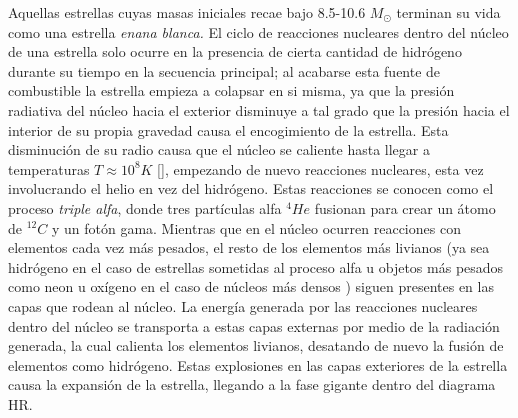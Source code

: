 Aquellas estrellas cuyas masas iniciales recae bajo 8.5-10.6 \(M_{\odot}\)
terminan su vida como una estrella \textit{enana blanca.}
\citet*{whiteDwarfsReview} El ciclo de reacciones nucleares dentro del núcleo de
una estrella solo ocurre en la presencia de cierta cantidad de hidrógeno durante
su tiempo en la secuencia principal; al acabarse esta fuente de combustible la
estrella empieza a colapsar en si misma, ya que la presión radiativa del núcleo
hacia el exterior disminuye a tal grado que la presión hacia el interior de su
propia gravedad causa el encogimiento de la estrella. Esta disminución de su
radio causa que el núcleo se caliente hasta llegar a temperaturas \(T \approx
10^{8} K\) [\citet*{astronomyPhysicalPerspective_stellarOldAgeChapter}],
empezando de nuevo reacciones nucleares, esta vez involucrando el helio en vez
del hidrógeno. Estas reacciones se conocen como el proceso \textit{triple alfa},
donde tres partículas alfa \(^{4}He\) fusionan para crear un átomo de \(^{12}C\)
y un fotón gama. Mientras que en el núcleo ocurren reacciones con elementos cada
vez más pesados, el resto de los elementos más livianos (ya sea hidrógeno en el
caso de estrellas sometidas al proceso alfa u objetos más pesados como neon u
oxígeno en el caso de núcleos más densos
\citet*{astronomyPhysicalPerspective_stellarOldAgeChapter}) siguen presentes en
las capas que rodean al núcleo. La energía generada por las reacciones nucleares
dentro del núcleo se transporta a estas capas externas por medio de la radiación
generada, la cual calienta los elementos livianos, desatando de nuevo la fusión
de elementos como hidrógeno. Estas explosiones en las capas exteriores de la
estrella causa la expansión de la estrella, llegando a la fase gigante dentro
del diagrama HR.

